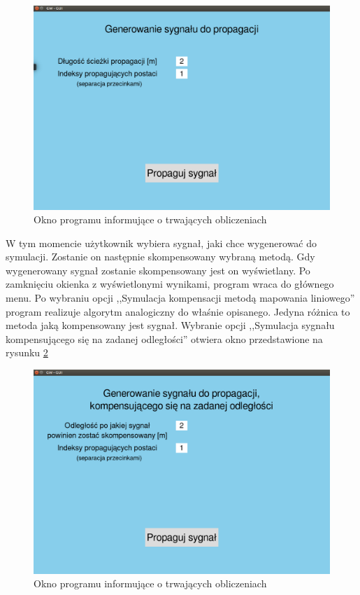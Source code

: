 \begin{figure}[h]
\centering
\includegraphics[width=13cm]{Zdjecia/5/kasia/guiKomp1}
\caption{Okno programu informujące o trwających obliczeniach}
\label{fig:guiKomp1}
\end{figure}

W tym momencie użytkownik wybiera sygnał, jaki chce wygenerować do symulacji. Zostanie on następnie skompensowany wybraną metodą. Gdy wygenerowany sygnał zostanie skompensowany jest on wyświetlany. Po zamknięciu okienka z wyświetlonymi wynikami, program wraca do głównego menu. Po wybraniu opcji ,,Symulacja kompensacji metodą mapowania liniowego'' program realizuje algorytm analogiczny do właśnie opisanego. Jedyna różnica to metoda jaką kompensowany jest sygnał. Wybranie opcji ,,Symulacja sygnału kompensującego się na zadanej odległości'' otwiera okno przedstawione na rysunku \ref{fig:guiLast}

\begin{figure}[h]
\centering
\includegraphics[width=13cm]{Zdjecia/5/kasia/guiLast}
\caption{Okno programu informujące o trwających obliczeniach}
\label{fig:guiLast}
\end{figure}


